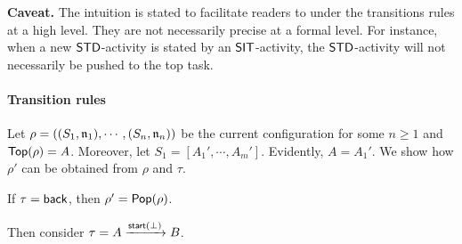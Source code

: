 \noindent\textbf{Caveat.} The intuition is stated to facilitate readers to under the transitions rules at a high level. They are not necessarily precise at a formal level. For instance, when a new $\mathsf{STD}$-activity is stated by an $\mathsf{SIT}$-activity, the $\mathsf{STD}$-activity will not necessarily be pushed to the top task. 


\smallskip

\paragraph{Transition rules} 


Let $\rho = ((S_1,\mathfrak{n}_1),\cdots,(S_n,\mathfrak{n}_n))$ be the current configuration for some $n \ge 1$ and $\mathsf{Top}(\rho) = A$. Moreover, let $S_1 = [A_1',\cdots,A_m']$. Evidently, $A = A_1'$. We show how $\rho'$ can be obtained from $\rho$ and $\tau$.
	
	If $\tau = {\mathsf{back} }$, then $\rho' = \mathsf{Pop}(\rho)$. 
	
	Then consider $\tau = A\xrightarrow{{\mathsf{start} }(\bot)}B$.
	
	
	
	
	
	

